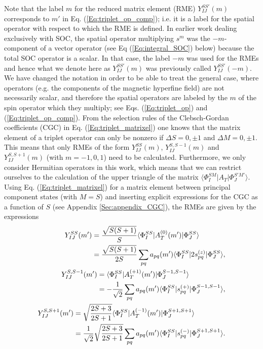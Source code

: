 Note that the label $m$ for the reduced matrix element (RME) $Y_{IJ}^{SS'}(m)$ corresponds to $m'$ in Eq. (\ref{Eq:triplet_op_comp}); i.e. it is a label for the spatial operator with respect to which the RME is defined. In earlier work dealing exclusively with SOC,\cite{GanyuN_2006_24103, NeeseS_1998_6568} the spatial operator multiplying ${s^m}$ was the $ - m$-component of a vector operator (see Eq (\ref{Eq:integral_SOC}) below) because the total SOC operator is a scalar. In that case, the label $ - m$ was used for the RMEs and hence what we denote here as $Y_{IJ}^{SS'}(m)$ was previously called $Y_{IJ}^{SS'}( - m)$. We have changed the notation in order to be able to treat the general case, where operators (e.g. the components of the magnetic hyperfine field) are not necessarily scalar, and therefore the spatial operators are labeled by the $m$ of the spin operator which they multiply; see Eqs. (\ref{Eq:triplet_op}) and (\ref{Eq:triplet_op_comp}).
From the selection rules of the Clebsch-Gordan coefficients (CGC) in Eq. (\ref{Eq:triplet_matrixel}) one knows that the matrix element of a triplet operator can only be nonzero if $\Delta S = 0, \pm 1$ and $\Delta M = 0, \pm 1$. This means that only RMEs of the form $Y_{IJ}^{SS}(m)$, $Y_{IJ}^{S,S - 1}(m)$ and $Y_{IJ}^{S,S + 1}(m)$ (with $m =  - 1,0,1$) need to be calculated. Furthermore, we only consider Hermitian operators in this work, which means that we can restrict ourselves to the calculation of the upper triangle of the matrix $\langle \Phi _I^{SM}|{A_T}|\Phi _J^{S'M'}\rangle $. Using Eq. (\ref{Eq:triplet_matrixel}) for a matrix element between principal component states (with $M = S$) and inserting explicit expressions for the CGC as a function of $S$ (see Appendix \ref{Sec:appendix_CGC}), the RMEs are given by the expressions
	\begin{align}
	\label{Eq:RME_SS}
	\begin{split}
  Y_{IJ}^{SS}(m') &= \frac{{\sqrt {S(S + 1)} }}{S}\langle \Phi _I^{SS}|A_T^{(0)}(m')|\Phi _J^{SS}\rangle  \hfill \\
   &= \frac{{\sqrt {S(S + 1)} }}{{2S}}\sum\limits_{pq} {{a_{pq}}} (m')\langle \Phi _I^{SS}|2s_{pq}^{(z)}|\Phi _J^{SS}\rangle,    
\end{split} \\
	\label{Eq:RME_SS-1}
	\begin{split}
  Y_{IJ}^{S,S - 1}(m') &= \langle \Phi _I^{SS}|A_T^{( + 1)}(m')|\Phi _J^{S - 1,S - 1}\rangle  \hfill \\
   &=  - \frac{1}{{\sqrt 2 }}\sum\limits_{pq} {{a_{pq}}} (m')\langle \Phi _I^{SS}|s_{pq}^{( + )}|\Phi _J^{S - 1,S - 1}\rangle,   
\end{split} \\
	\label{Eq:RME_SS+1}
	\begin{split}
  Y_{IJ}^{S,S + 1}(m') &= \sqrt {\frac{{2S + 3}}{{2S + 1}}} \langle \Phi _I^{SS}|A_T^{( - 1)}(m')|\Phi _J^{S + 1,S + 1}\rangle  \hfill \\
   &= \frac{1}{{\sqrt 2 }}\sqrt {\frac{{2S + 3}}{{2S + 1}}} \sum\limits_{pq} {{a_{pq}}} (m')\langle \Phi _I^{SS}|s_{pq}^{( - )}|\Phi _J^{S + 1,S + 1}\rangle. 
\end{split} 
\end{align} 	
